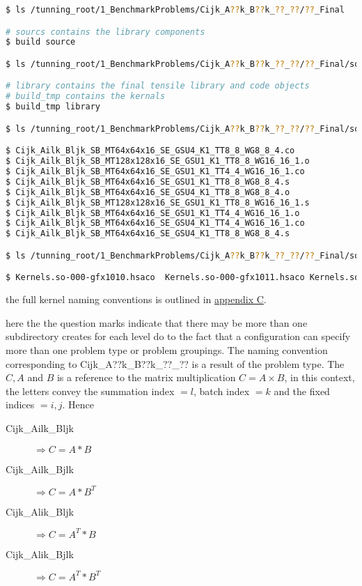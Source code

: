 \documentclass[]{article}
\begin{document}
\begin{lstlisting}[language=bash,breaklines=true, emph={build,ls,build_tmp,library}, emphstyle=\color{blue}]
$ ls /tunning_root/1_BenchmarkProblems/Cijk_A??k_B??k_??_??/??_Final

# sourcs contains the library components
$ build source

$ ls /tunning_root/1_BenchmarkProblems/Cijk_A??k_B??k_??_??/??_Final/source

# library contains the final tensile library and code objects
# build_tmp contains the kernals
$ build_tmp library

$ ls /tunning_root/1_BenchmarkProblems/Cijk_A??k_B??k_??_??/??_Final/source/build_tmp/SOURCETMP/assembly

$ Cijk_Ailk_Bljk_SB_MT64x64x16_SE_GSU4_K1_TT8_8_WG8_8_4.co
$ Cijk_Ailk_Bljk_SB_MT128x128x16_SE_GSU1_K1_TT8_8_WG16_16_1.o
$ Cijk_Ailk_Bljk_SB_MT64x64x16_SE_GSU1_K1_TT4_4_WG16_16_1.co
$ Cijk_Ailk_Bljk_SB_MT64x64x16_SE_GSU1_K1_TT8_8_WG8_8_4.s
$ Cijk_Ailk_Bljk_SB_MT64x64x16_SE_GSU4_K1_TT8_8_WG8_8_4.o
$ Cijk_Ailk_Bljk_SB_MT128x128x16_SE_GSU1_K1_TT8_8_WG16_16_1.s
$ Cijk_Ailk_Bljk_SB_MT64x64x16_SE_GSU1_K1_TT4_4_WG16_16_1.o
$ Cijk_Ailk_Bljk_SB_MT64x64x16_SE_GSU4_K1_TT4_4_WG16_16_1.co
$ Cijk_Ailk_Bljk_SB_MT64x64x16_SE_GSU4_K1_TT8_8_WG8_8_4.s

$ ls /tunning_root/1_BenchmarkProblems/Cijk_A??k_B??k_??_??/??_Final/source/library

$ Kernels.so-000-gfx1010.hsaco  Kernels.so-000-gfx1011.hsaco Kernels.so-000-gfx803.hsaco Kernels.so-000-gfx900.hsaco Kernels.so-000-gfx906.hsaco  Kernels.so-000-gfx908.hsaco TensileLibrary_gfx906.co TensileLibrary.yaml

\end{lstlisting}

\noindent the full kernel naming conventions is outlined in \hyperref[sec:appendixC]{appendix C}. 

here the the question marks indicate that there may be more than one subdirectory creates for each level do to the fact that a configuration can specify more than one problem type or problem groupings. The naming convention corresponding to Cijk\_A??k\_B??k\_??\_?? is a result of the problem type. The $ C, A $ and $ B $ is a reference to the matrix multiplication $ C = A \times B $, in this context, the letters convey the summation index $= l$, batch index $= k$ and the fixed indices $=i,j$. Hence

\begin{description}
	\item[Cijk\_Ailk\_Bljk]  $ \Longrightarrow C = A * B $
	\item[Cijk\_Ailk\_Bjlk]  $ \Longrightarrow C = A * B^T $
	\item[Cijk\_Alik\_Bljk]  $ \Longrightarrow C = A^T * B $
	\item[Cijk\_Alik\_Bjlk]  $ \Longrightarrow C = A^T * B^T $
\end{description}
\end{document}
